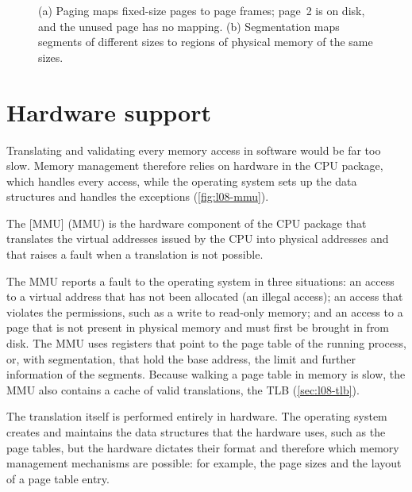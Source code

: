 \documentclass[../main.tex]{subfiles}
\begin{document}
\begin{figure}[htbp]
  \centering
  
  \caption{(a) Paging maps fixed-size pages to page frames; page~2 is on
    disk, and the unused page has no mapping.  (b) Segmentation maps
    segments of different sizes to regions of physical memory of the same
    sizes.}
  \label{fig:l08-goals}
\end{figure}

\section{Hardware support}
\label{sec:l08-hardware}

Translating and validating every memory access in software would be far
too slow.  Memory management therefore relies on hardware in the CPU
package, which handles every access, while the operating system sets up the
data structures and handles the exceptions (\cref{fig:l08-mmu}).

\begin{definition}
  The [MMU]
  (MMU) is the hardware component of the CPU package that translates the
  virtual addresses issued by the CPU into physical addresses and that
  raises a fault when a translation is not possible.
\end{definition}

The MMU reports a fault to the operating system in three situations: an
access to a virtual address that has not been allocated (an illegal
access); an access that violates the permissions, such as a write to
read-only memory; and an access to a page that is not present in physical
memory and must first be brought in from disk.  The MMU uses registers that
point to the page table of the running process, or, with segmentation,
that hold the base address, the limit and further information of the
segments.  Because walking a page table in memory is slow, the MMU also
contains a cache of valid translations, the TLB (\cref{sec:l08-tlb}).

The translation itself is performed entirely in hardware.  The operating system creates and maintains the data structures
that the hardware uses, such as the page tables, but the hardware dictates
their format and therefore which memory management mechanisms are possible:
for example, the page sizes and the layout of a page table entry.
\end{document}
